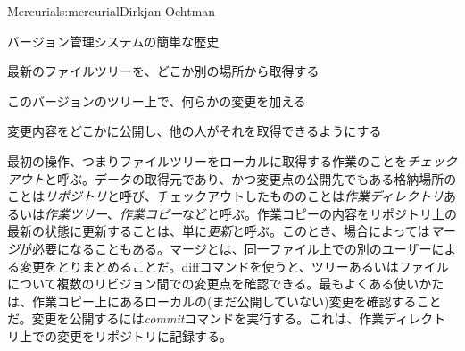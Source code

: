 \begin{aosachapter}{Mercurial}{s:mercurial}{Dirkjan Ochtman}
\begin{aosasect1}{バージョン管理システムの簡単な歴史}
\begin{aosaenumerate}

  \item 最新のファイルツリーを、どこか別の場所から取得する

  \item このバージョンのツリー上で、何らかの変更を加える

  \item 変更内容をどこかに公開し、他の人がそれを取得できるようにする

\end{aosaenumerate}

\noindent
最初の操作、つまりファイルツリーをローカルに取得する作業のことを\emph{チェックアウト}と呼ぶ。データの取得元であり、かつ変更点の公開先でもある格納場所のことは\emph{リポジトリ}と呼び、チェックアウトしたもののことは\emph{作業ディレクトリ}あるいは\emph{作業ツリー}、\emph{作業コピー}などと呼ぶ。作業コピーの内容をリポジトリ上の最新の状態に更新することは、単に\emph{更新}と呼ぶ。このとき、場合によっては\emph{マージ}が必要になることもある。マージとは、同一ファイル上での別のユーザーによる変更をとりまとめることだ。diffコマンドを使うと、ツリーあるいはファイルについて複数のリビジョン間での変更点を確認できる。最もよくある使いかたは、作業コピー上にあるローカルの(まだ公開していない)変更を確認することだ。変更を公開するには\emph{commit}コマンドを実行する。これは、作業ディレクトリ上での変更をリポジトリに記録する。


\end{aosasect1}
\end{aosachapter}
